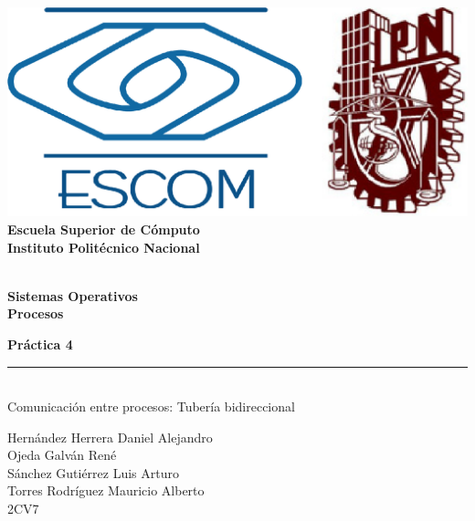 
\begin{titlepage} %

    \begin{flushright}

	   \includegraphics[scale=0.15]{imagenes/escom-ipn.png}
	   \large \textbf{\\Escuela Superior de C\'omputo}
	   \large \textbf{\\Instituto Polit\'ecnico Nacional }%

	   \vspace{2.5cm} %

	   \large \textbf{\\Sistemas Operativos}%
	   \large \textbf{\\Procesos}%

	   \vspace{1.2cm} %

	   \large \textbf{Pr\'actica 4}\\%
	   \rule{9cm}{3pt} %
	   \large{\\ Comunicación entre procesos: Tubería bidireccional} %

	   \vspace{2.5cm} %

	   Hernández Herrera Daniel Alejandro\\
	   Ojeda Galván René\\
	   Sánchez Gutiérrez Luis Arturo\\
	   Torres Rodríguez Mauricio Alberto \\ %
	   2CV7 %

	   \vspace{2.5cm} %

	   \date{\today}

    \end{flushright}

\end{titlepage}
